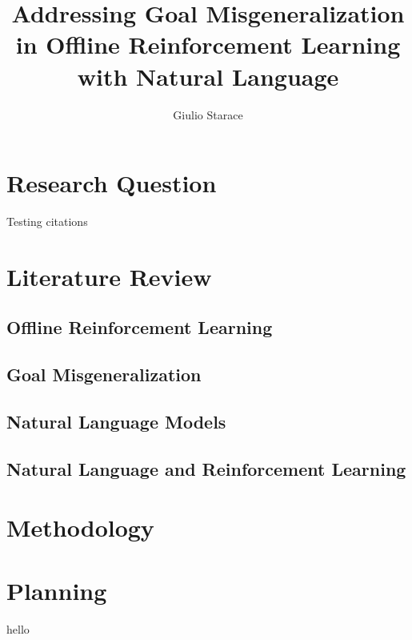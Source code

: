 \documentclass[12pt]{article}
\title{Addressing Goal Misgeneralization in Offline Reinforcement Learning with Natural Language}
\begin{document}
\author{Giulio Starace}
\maketitle
\section*{Research Question}
Testing citations~\citet{abbeel_apprenticeship_2004}
\section*{Literature Review}
\subsection*{Offline Reinforcement Learning}
\subsection*{Goal Misgeneralization}
\subsection*{Natural Language Models}
\subsection*{Natural Language and Reinforcement Learning}
\section*{Methodology}
\section*{Planning}



hello
\end{document}

